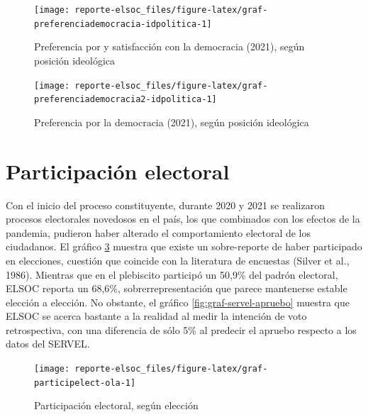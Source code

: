 \documentclass[
  12pt,
]{book}
\begin{document}
\begin{figure}

{\centering \texttt{[image: reporte-elsoc\_files/figure-latex/graf-preferenciademocracia-idpolitica-1]} 

}

\caption{Preferencia por y satisfacción con la democracia (2021), según posición ideológica}\label{fig:graf-preferenciademocracia-idpolitica}
\end{figure}

\begin{figure}

{\centering \texttt{[image: reporte-elsoc\_files/figure-latex/graf-preferenciademocracia2-idpolitica-1]} 

}

\caption{Preferencia por la democracia (2021), según posición ideológica}\label{fig:graf-preferenciademocracia2-idpolitica}
\end{figure}

\hypertarget{participaciuxf3n-electoral}{%
\section{Participación electoral}\label{participaciuxf3n-electoral}}

Con el inicio del proceso constituyente, durante 2020 y 2021 se realizaron procesos electorales novedosos en el país, los que combinados con los efectos de la pandemia, pudieron haber alterado el comportamiento electoral de los ciudadanos. El gráfico \ref{fig:graf-participelect-ola} muestra que existe un sobre-reporte de haber participado en elecciones, cuestión que coincide con la literatura de encuestas (Silver et al., 1986). Mientras que en el plebiscito participó un 50,9\% del padrón electoral, ELSOC reporta un 68,6\%, sobrerrepresentación que parece mantenerse estable elección a elección. No obstante, el gráfico \ref{fig:graf-servel-apruebo} muestra que ELSOC se acerca bastante a la realidad al medir la intención de voto retrospectiva, con una diferencia de sólo 5\% al predecir el apruebo respecto a los datos del SERVEL.

\begin{figure}

{\centering \texttt{[image: reporte-elsoc\_files/figure-latex/graf-participelect-ola-1]} 

}

\caption{Participación electoral, según elección}\label{fig:graf-participelect-ola}
\end{figure}
\end{document}
